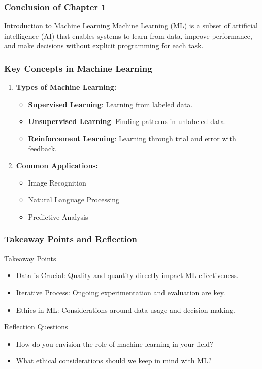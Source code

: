 \documentclass[aspectratio=169]{beamer}
\begin{document}
\begin{frame}[fragile]
    \frametitle{Conclusion of Chapter 1}
    \begin{block}{Introduction to Machine Learning}
        Machine Learning (ML) is a subset of artificial intelligence (AI) that enables systems to learn from data, improve performance, and make decisions without explicit programming for each task.
    \end{block}
\end{frame}

\begin{frame}[fragile]
    \frametitle{Key Concepts in Machine Learning}
    \begin{enumerate}
        \item \textbf{Types of Machine Learning:}
        \begin{itemize}
            \item \textbf{Supervised Learning}: Learning from labeled data.
            \item \textbf{Unsupervised Learning}: Finding patterns in unlabeled data.
            \item \textbf{Reinforcement Learning}: Learning through trial and error with feedback.
        \end{itemize}
        \item \textbf{Common Applications:}
        \begin{itemize}
            \item Image Recognition
            \item Natural Language Processing
            \item Predictive Analysis
        \end{itemize}
    \end{enumerate}
\end{frame}

\begin{frame}[fragile]
    \frametitle{Takeaway Points and Reflection}
    \begin{block}{Takeaway Points}
        \begin{itemize}
            \item Data is Crucial: Quality and quantity directly impact ML effectiveness.
            \item Iterative Process: Ongoing experimentation and evaluation are key.
            \item Ethics in ML: Considerations around data usage and decision-making.
        \end{itemize}
    \end{block}
    \begin{block}{Reflection Questions}
        \begin{itemize}
            \item How do you envision the role of machine learning in your field?
            \item What ethical considerations should we keep in mind with ML?
        \end{itemize}
    \end{block}
\end{frame}
\end{document}
